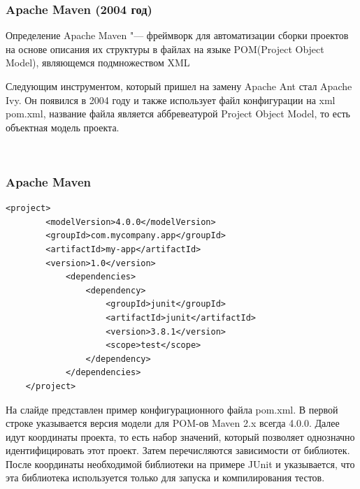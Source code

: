 \documentclass{../industrial-development}
\begin{document}
\begin{frame} \frametitle{Apache Maven (2004 год)}
	\begin{block}{Определение}
		Apache Maven "--- фреймворк для автоматизации сборки проектов на основе описания их структуры в файлах на языке POM(Project Object Model), являющемся подмножеством XML
	\end{block}
\end{frame}
\lecturenotes
Следующим инструментом, который пришел на замену Apache Ant стал Apache Ivy. Он появился в 2004 году и также использует файл конфигурации на xml pom.xml, название файла является аббревеатурой Project Object Model, то есть объектная модель проекта.

~\cite{Wiki_Apache_Ant}
~\cite{Yandex_Build_Automation}


\begin{frame}[fragile] \frametitle{Apache Maven}
	\begin{lstlisting}[label=some-code,caption=pom.xml]
	<project>
		<modelVersion>4.0.0</modelVersion>
		<groupId>com.mycompany.app</groupId>
		<artifactId>my-app</artifactId>
		<version>1.0</version>
			<dependencies>
				<dependency>
					<groupId>junit</groupId>
					<artifactId>junit</artifactId>
					<version>3.8.1</version>
					<scope>test</scope>
				</dependency>
			</dependencies>
	</project>
	\end{lstlisting}
\end{frame}
\lecturenotes
На слайде представлен пример конфигурационного файла pom.xml.
В первой строке указывается версия модели для POM-ов Maven 2.x всегда 4.0.0.
Далее идут координаты проекта, то есть набор значений, который
позволяет однозначно идентифицировать этот проект. Затем перечисляются зависимости от библиотек. После координаты необходимой библиотеки на примере JUnit и указывается, что эта библиотека используется только для запуска и компилирования тестов.
~\cite{Yandex_Build_Automation}
\end{document}
